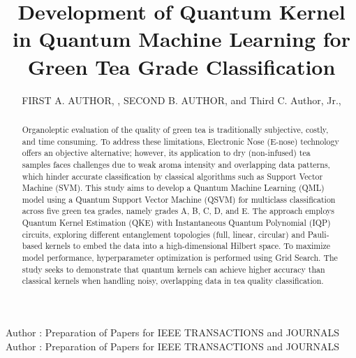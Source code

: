 \documentclass{ieeeaccess}
\begin{document}

\title{Development of Quantum Kernel in Quantum Machine Learning for Green Tea Grade Classification}
\author{\uppercase{First A. Author}, ,
\uppercase{Second B. Author}, and Third C. Author,
Jr.,
}

\address[1]{National Institute of Standards and
Technology, Boulder, CO 80305 USA (e-mail: author@boulder.nist.gov)}
\address[2]{Department of Physics, Colorado State University, Fort Collins,
CO 80523 USA (e-mail: author@lamar.colostate.edu)}
\address[3]{Electrical Engineering Department, University of Colorado, Boulder, CO
80309 USA}

\markboth
{Author \headeretal: Preparation of Papers for IEEE TRANSACTIONS and JOURNALS}
{Author \headeretal: Preparation of Papers for IEEE TRANSACTIONS and JOURNALS}



\begin{abstract}
Organoleptic evaluation of the quality of green tea is traditionally subjective, costly, and time consuming. To address these limitations, Electronic Nose (E-nose) technology offers an objective alternative; however, its application to dry (non-infused) tea samples faces challenges due to weak aroma intensity and overlapping data patterns, which hinder accurate classification by classical algorithms such as Support Vector Machine (SVM). This study aims to develop a Quantum Machine Learning (QML) model using a Quantum Support Vector Machine (QSVM) for multiclass classification across five green tea grades, namely grades A, B, C, D, and E. The approach employs Quantum Kernel Estimation (QKE) with Instantaneous Quantum Polynomial (IQP) circuits, exploring different entanglement topologies (full, linear, circular) and Pauli-based kernels to embed the data into a high-dimensional Hilbert space. To maximize model performance, hyperparameter optimization is performed using Grid Search. The study seeks to demonstrate that quantum kernels can achieve higher accuracy than classical kernels when handling noisy, overlapping data in tea quality classification.
\end{abstract}
\end{document}
